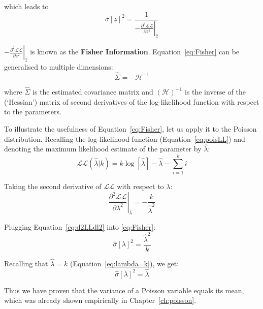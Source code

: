 \noindent which leads to
\begin{equation}
  \hat{\sigma}[z]^2 =
  \frac{1}{-\left.\frac{\partial^2\mathcal{LL}}{\partial{z^2}}\right|_{\hat{z}}}
  \label{eq:Fisher}
\end{equation}

$-\left.\frac{\partial^2\mathcal{LL}}{\partial{z^2}}\right|_{\hat{z}}$ is known as the
\textbf{Fisher Information}. Equation~\ref{eq:Fisher} can be
generalised to multiple dimensions:
\begin{equation}
  \hat{\Sigma} = -\mathcal{H}^{-1}
  \label{eq:multidimFisher}
\end{equation}

\noindent where $\hat{\Sigma}$ is the estimated covariance matrix and
$(\mathcal{H})^{-1}$ is the inverse of the (`Hessian') matrix of
second derivatives of the log-likelihood function with respect to the
parameters.\medskip

To illustrate the usefulness of Equation~\ref{eq:Fisher}, let us apply
it to the Poisson distribution.  Recalling the log-likelihood function
(Equation~\ref{eq:poisLL}) and denoting the maximum likelihood
estimate of the parameter by $\hat{\lambda}$:
\[
\mathcal{LL}(\hat{\lambda}|k) =
k \log[\hat{\lambda}] - \hat{\lambda} - \sum\limits_{i=1}^{k}i
\]

Taking the second derivative of $\mathcal{LL}$ with respect to
$\lambda$:
\begin{equation}
  \left.\frac{\partial^2{\mathcal{LL}}}{\partial{\lambda^2}}\right|_{\hat{\lambda}}\! =
  -\frac{k}{\hat{\lambda}^2}
  \label{eq:d2LLdl2}
\end{equation}

Plugging Equation~\ref{eq:d2LLdl2} into \ref{eq:Fisher}:
\[
  \hat{\sigma}[\lambda]^2 = \frac{\hat{\lambda}^2}{k}
\]

Recalling that $\hat{\lambda} = k$ (Equation~\ref{eq:lambda=k}), we
get:
\begin{equation}
  \hat{\sigma}[\lambda]^2 = \hat{\lambda}
  \label{eq:poisvar}
\end{equation}

Thus we have proven that the variance of a Poisson variable equals its
mean, which was already shown empirically in Chapter~\ref{ch:poisson}.
